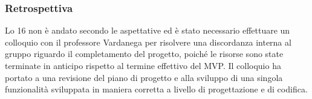 \subsubsection{Retrospettiva}
\label{sec:retrospettiva_sprint16}

Lo  16 non è andato secondo le aspettative ed è stato necessario effettuare un colloquio con il professore Vardanega per risolvere
una discordanza interna al gruppo riguardo il completamento del progetto, poiché le risorse sono state terminate in anticipo rispetto al termine effettivo del MVP.
Il colloquio ha portato a una revisione del piano di progetto e alla sviluppo di una singola funzionalità sviluppata in maniera corretta a livello di progettazione e di codifica.